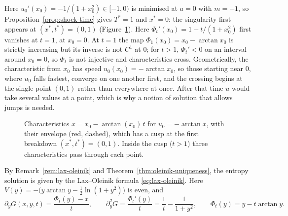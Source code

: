 Here $u_0'(x_0)=-1/(1+x_0^2)\in[-1,0)$ is minimised at $a=0$ with $m=-1$, so
Proposition~\ref{prop:shock-time} gives $T^*=1$ and $x^*=0$: the singularity
first appears at $(x^*,t^*)=(0,1)$ (Figure~\ref{fig:characteristics}). Here
$\Phi_t'(x_0)=1-t/(1+x_0^2)$ first vanishes at $t=1$, at $x_0=0$. At $t=1$ the
map $\Phi_1(x_0)=x_0-\arctan x_0$ is strictly increasing but its inverse is
not $C^1$ at $0$; for $t>1$, $\Phi_t'<0$ on an interval around $x_0=0$, so
$\Phi_t$ is not injective and characteristics cross.
Geometrically, the characteristic from $x_0$ has speed $u_0(x_0)=-\arctan x_0$, so
those starting near $0$, where $u_0$ falls fastest, converge on one another first,
and the crossing begins at the single point $(0,1)$ rather than everywhere at once.
After that time $u$ would take several values at a point, which is why a notion of
solution that allows jumps is needed.

\begin{figure}[htbp]
\centering
{}
\caption{Characteristics $x=x_0-\arctan(x_0)\,t$ for $u_0=-\arctan x$, with
their envelope (red, dashed), which has a cusp at the first breakdown
$(x^*,t^*)=(0,1)$. Inside the cusp ($t>1$) three characteristics pass through
each point.}
\label{fig:characteristics}
\end{figure}

By Remark~\ref{rem:lax-oleinik} and Theorem~\ref{thm:oleinik-uniqueness}, the
entropy solution is given by the Lax--Oleinik formula \eqref{eq:lax-oleinik}.
Here $V(y)=-\big(y\arctan y-\tfrac12\ln(1+y^2)\big)$ is even, and
\begin{equation*}
  \partial_yG(x,y,t)=\frac{\Phi_t(y)-x}{t},\qquad
  \partial_y^2G=\frac{\Phi_t'(y)}{t}=\frac1t-\frac1{1+y^2},\qquad
  \Phi_t(y)=y-t\arctan y .
\end{equation*}

